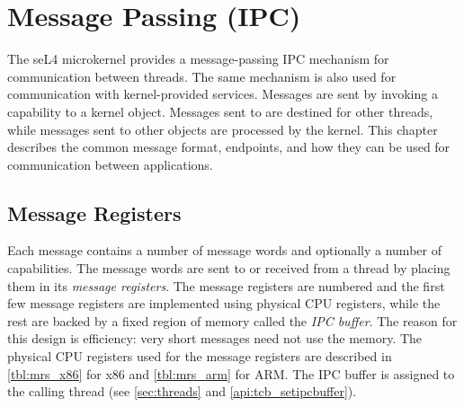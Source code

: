 %
%
%
%

\chapter{\label{ch:ipc}Message Passing (IPC)}

The seL4 microkernel provides a message-passing IPC mechanism for communication
between threads. The same mechanism is also used for communication with
kernel-provided services. Messages are sent by invoking a capability to a
kernel object. Messages sent to  are destined for other
threads, while messages sent to other objects are processed by the kernel. This
chapter describes the common message format, endpoints,
and how they can be used for communication between applications.

\section{Message Registers}
\label{sec:messageinfo}

Each message contains a number of message words and optionally a number of
capabilities.
The message words are sent to or received from a thread by placing them in its \emph{message registers}.
The message registers are numbered and the first few message registers are implemented
using physical CPU registers, while the rest are backed by a fixed region of
memory called the \emph{IPC buffer}.
The reason for this design is efficiency:
very short messages need not use the memory.
The physical CPU registers used for the
message registers are described in \ifxeightsix\autoref{tbl:mrs_x86} for x86
and \fi \autoref{tbl:mrs_arm} for ARM.
The IPC buffer is assigned to the calling thread (see \autoref{sec:threads} and \autoref{api:tcb_setipcbuffer}).

